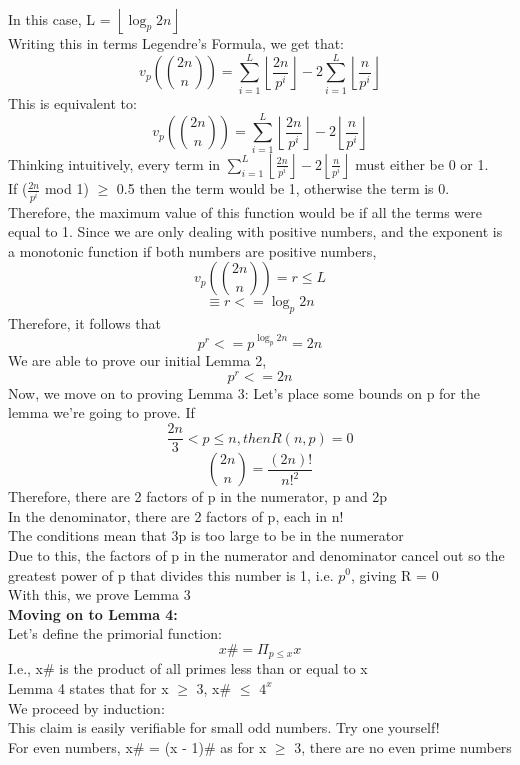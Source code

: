 \documentclass[conference]{IEEEtran}
\begin{document}
In this case, L = $\left\lfloor \log_{p}{2n} \right\rfloor$\\ Writing this in terms Legendre's Formula, we get that:
\[
    v_{p}(\binom{2n}{n}) = \sum_{i = 1}^{L} {\left\lfloor \frac{2n}{p^i} \right\rfloor} - 2\sum_{i = 1}^{L} {\left\lfloor \frac{n}{p^i} \right\rfloor}
\]
This is equivalent to:
\[
    v_{p}(\binom{2n}{n}) = \sum_{i = 1}^{L} {\left\lfloor \frac{2n}{p^i} \right\rfloor - 2\left\lfloor \frac{n}{p^i} \right\rfloor}
\]
Thinking intuitively, every term in $\sum_{i = 1}^{L} {\left\lfloor \frac{2n}{p^i} \right\rfloor - 2\left\lfloor \frac{n}{p^i} \right\rfloor}$ must either be 0 or 1.\\
If ($\frac{2n}{p^i}$ mod 1) $\geq$ 0.5 then the term would be 1, otherwise the term is 0. Therefore, the maximum value of this function would be if all the terms were equal to 1. Since we are only dealing with positive numbers, and the exponent is a monotonic function if both numbers are positive numbers,
\[
    v_{p}(\binom{2n}{n}) = r \leq L
\]
\[
    \equiv r <= \log_{p}{2n}
\]
Therefore, it follows that
\[
    p^r <= p^{\log_{p}{2n}} = 2n
\]
We are able to prove our initial Lemma 2, 
\[
    p^r <= 2n
\]
Now, we move on to proving Lemma 3:
Let's place some bounds on p for the lemma we're going to prove. If 
\[
    \frac{2n}{3} < p \leq n, then R(n, p) = 0
\]
\[
    {\binom{2n}{n}} = \frac{(2n)!}{{n!}^2}
\]
Therefore, there are 2 factors of p in the numerator, p and 2p\\
In the denominator, there are 2 factors of p, each in n!\\
The conditions mean that 3p is too large to be in the numerator\\
Due to this, the factors of p in the numerator and denominator cancel out so the greatest power of p that divides this number is 1, i.e. $p^0$, giving R = 0\\
With this, we prove Lemma 3\\
\textbf{Moving on to Lemma 4:}\\
Let's define the primorial function:
\[
    x\# = \Pi_{p \leq x} x
\]
I.e., x\# is the product of all primes less than or equal to x\\
Lemma 4 states that for x $\geq$ 3,  x\# $\leq$ $4^x$\\
We proceed by induction:\\
This claim is easily verifiable for small odd numbers. Try one yourself!\\
For even numbers, x\# = (x - 1)\# as for x $\geq$ 3, there are no even prime numbers\\
\end{document}
